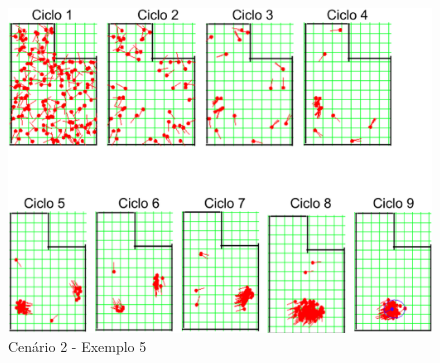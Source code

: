 \begin{figure}[H]
  \centering
  \includegraphics[scale=0.4]{figuras/cen2_ex5.eps}
  \caption[Cenário 2 - Exemplo 5]{Cenário 2 - Exemplo 5}
  \label{img:cen2_ex5}
\end{figure}
